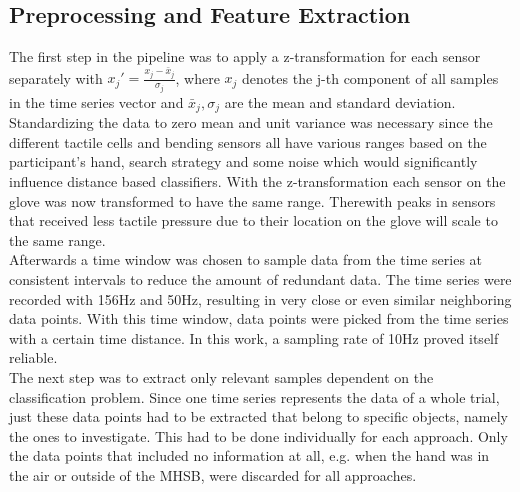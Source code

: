\subsection{Preprocessing and Feature Extraction}
The first step in the pipeline was to apply a z-transformation for each sensor separately with $ x_{j}' = \frac{x_{j}-\bar{x}_{j}}{\sigma_{j}} $, where $ x_{j} $ denotes the j-th component of all samples in the time series vector and $ \bar{x}_{j},\sigma_{j} $ are the mean and standard deviation. Standardizing the data to zero mean and unit variance was necessary since the different tactile cells and bending sensors all have various ranges based on the participant's hand, search strategy and some noise which would significantly influence distance based classifiers. With the z-transformation each sensor on the glove was now transformed to have the same range. Therewith peaks in sensors that received less tactile pressure due to their location on the glove will scale to the same range. \\
Afterwards a time window was chosen to sample data from the time series at consistent intervals to reduce the amount of redundant data. The time series were recorded with 156Hz and 50Hz, resulting in very close or even similar neighboring data points. With this time window, data points were picked from the time series with a certain time distance. In this work, a sampling rate of 10Hz proved itself reliable.\\
The next step was to extract only relevant samples dependent on the classification problem. Since one time series represents the data of a whole trial, just these data points had to be extracted that belong to specific objects, namely the ones to investigate. This had to be done individually for each approach. Only the data points that included no information at all, e.g. when the hand was in the air or outside of the MHSB, were discarded for all approaches. \\
